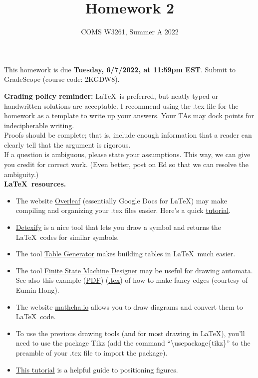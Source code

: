 \documentclass[letterpaper,11pt,twoside]{article}
\title{Homework 2}
\date{COMS W3261, Summer A 2022}
\theoremstyle{plain}
\theoremstyle{definition}
\theoremstyle{remark}
\theoremstyle{restate}
\begin{document}
\maketitle

This homework is due \textbf{Tuesday, 6/7/2022, at 11:59pm EST}. Submit to GradeScope (course code: 2KGDW8).

\textbf{Grading policy reminder:} \LaTeX~is preferred, but neatly typed or handwritten solutions are acceptable. I recommend using the .tex file for the homework as a template to write up your answers. Your TAs may dock points for indecipherable writing.\\

Proofs should be complete; that is, include enough information that a reader can clearly tell that the argument is rigorous. \\

If a question is ambiguous, please state your assumptions. This way, we can give you credit for correct work. (Even better, post on Ed so that we can resolve the ambiguity.) \\

\textbf{\LaTeX~resources.}
\begin{itemize}
    \item The website \href{https://www.overleaf.com/}{Overleaf} (essentially Google Docs for LaTeX) may make compiling and organizing your .tex files easier. Here's a quick \href{https://www.overleaf.com/learn/latex/Learn_LaTeX_in_30_minutes}{tutorial}.
    \item \href{https://detexify.kirelabs.org/classify.html}{Detexify} is a nice tool that lets you draw a symbol and returns the \LaTeX~codes for similar symbols. 
    \item The tool \href{https://www.tablesgenerator.com/}{Table Generator} makes building tables in \LaTeX~much easier.
    \item The tool \href{http://madebyevan.com/fsm/}{Finite State Machine Designer} may be useful for drawing automata. See also this example (\href{https://static.us.edusercontent.com/files/HZeTXimODzWeLvHIqsvjL2BG}{PDF}) (\href{https://static.us.edusercontent.com/files/RI3W8tQNvHMWFe9MkXV1KztA}{.tex}) of how to make fancy edges (courtesy of Eumin Hong).
    \item The website \href{https://www.mathcha.io/}{mathcha.io} allows you to draw diagrams and convert them to \LaTeX~code.
    \item To use the previous drawing tools (and for most drawing in \LaTeX), you'll need to use the package Tikz (add the command ``\textbackslash usepackage\{tikz\}'' to the preamble of your .tex file to import the package). 
    \item \href{https://www.overleaf.com/learn/latex/Positioning_of_Figures}{This tutorial} is a helpful guide to positioning figures.
\end{itemize}  
\end{document}

